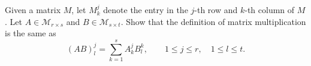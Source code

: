 \begin{exercise}
  \label{ex:hw02:matrix-product-entries}
  Given a matrix \(M\), let \(M^j_k\) denote the entry in the \(j\)-th
  row and \(k\)-th column of \(M\). Let \(A\in\mathcal M_{r\times s}\)
  and \(B\in\mathcal M_{s\times t}\). Show that the definition of
  matrix multiplication is the same as
  \[
    (AB)^j_l=\sum_{k=1}^s A^j_kB^k_l,
    \qquad 1\le j\le r,\quad 1\le l\le t.
  \]
\end{exercise}
